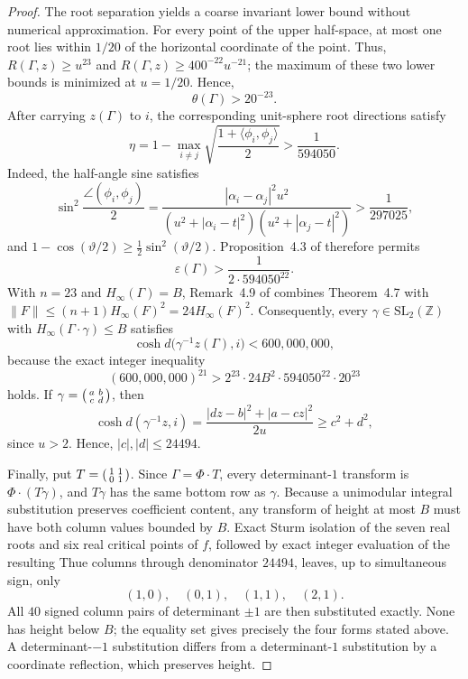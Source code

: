 \documentclass[11pt]{article}
\begin{document}
\begin{proof}
The root separation yields a coarse invariant lower bound without numerical approximation.  For every point of the upper half-space, at most one root lies within $1/20$ of the horizontal coordinate of the point.  Thus, $R(\Gamma,z)\ge u^{23}$ and $R(\Gamma,z)\ge400^{-22}u^{-21}$; the maximum of these two lower bounds is minimized at $u=1/20$.  Hence,
\[
 \theta(\Gamma)>20^{-23}.
\]
After carrying $z(\Gamma)$ to $i$, the corresponding unit-sphere root directions satisfy
\[
 \eta
 =1-\max_{i\ne j}\sqrt{\frac{1+\langle\phi_i,\phi_j\rangle}{2}}
 >\frac1{594050}.
\]
Indeed, the half-angle sine satisfies
\[
 \sin^2\!\frac{\angle(\phi_i,\phi_j)}2
 =\frac{|\alpha_i-\alpha_j|^2u^2}
 {(u^2+|\alpha_i-t|^2)(u^2+|\alpha_j-t|^2)}
 >\frac{1}{297025},
\]
and $1-\cos(\vartheta/2)\ge\frac12\sin^2(\vartheta/2)$.  Proposition~4.3 of \cite{HutzStoll2019} therefore permits
\[
 \varepsilon(\Gamma)>\frac{1}{2\cdot594050^{22}}.
\]
With $n=23$ and $H_\infty(\Gamma)=B$, Remark~4.9 of \cite{HutzStoll2019} combines Theorem~4.7 with $\|F\|\le(n+1)H_\infty(F)^2=24H_\infty(F)^2$.  Consequently, every $\gamma\in\mathrm{SL}_2(\mathbb Z)$ with $H_\infty(\Gamma\mathbin{\cdot}\gamma)\le B$ satisfies
\[
 \cosh d\bigl(\gamma^{-1}z(\Gamma),i\bigr)<600{,}000{,}000,
\]
because the exact integer inequality
\[
 (600{,}000{,}000)^{21}>
 2^{23}\cdot24B^2\cdot594050^{22}\cdot20^{23}
\]
holds.  If $\gamma=\begin{psmallmatrix}a&b\\c&d\end{psmallmatrix}$, then
\[
 \cosh d(\gamma^{-1}z,i)
 =\frac{|dz-b|^2+|a-cz|^2}{2u}
 \ge c^2+d^2,
\]
since $u>2$.  Hence, $|c|,|d|\le24494$.

Finally, put $T=\begin{psmallmatrix}1&1\\0&1\end{psmallmatrix}$.  Since $\Gamma=\Phi\mathbin{\cdot}T$, every determinant-$1$ transform is $\Phi\mathbin{\cdot}(T\gamma)$, and $T\gamma$ has the same bottom row as $\gamma$.  Because a unimodular integral substitution preserves coefficient content, any transform of height at most $B$ must have both column values bounded by $B$.  Exact Sturm isolation of the seven real roots and six real critical points of $f$, followed by exact integer evaluation of the resulting Thue columns through denominator $24494$, leaves, up to simultaneous sign, only
\[
 (1,0),\quad(0,1),\quad(1,1),\quad(2,1).
\]
All $40$ signed column pairs of determinant $\pm1$ are then substituted exactly.  None has height below $B$; the equality set gives precisely the four forms stated above.  A determinant-$-1$ substitution differs from a determinant-$1$ substitution by a coordinate reflection, which preserves height.
\end{proof}
\end{document}

